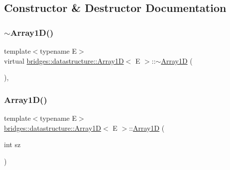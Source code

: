 \subsection{Constructor \& Destructor Documentation}
\mbox{\label{classbridges_1_1datastructure_1_1_array1_d_a690a7802e32842acfda2688459bb2caa}} 
\subsubsection{\texorpdfstring{$\sim$Array1D()}{~Array1D()}}
{\footnotesize\ttfamily template$<$typename E$>$ \\
virtual \mbox{\hyperlink{classbridges_1_1datastructure_1_1_array1_d}{bridges\+::datastructure\+::\+Array1D}}$<$ E $>$\+::$\sim$\mbox{\hyperlink{classbridges_1_1datastructure_1_1_array1_d}{Array1D}} (\begin{DoxyParamCaption}{ }\end{DoxyParamCaption})\hspace{0.3cm}{\ttfamily [inline]}, {\ttfamily [virtual]}}

\mbox{\label{classbridges_1_1datastructure_1_1_array1_d_a04e070ed24a1c6e9d200add01ec91c95}} 
\subsubsection{\texorpdfstring{Array1D()}{Array1D()}}
{\footnotesize\ttfamily template$<$typename E$>$ \\
\mbox{\hyperlink{classbridges_1_1datastructure_1_1_array1_d}{bridges\+::datastructure\+::\+Array1D}}$<$ E $>$\+::\mbox{\hyperlink{classbridges_1_1datastructure_1_1_array1_d}{Array1D}} (\begin{DoxyParamCaption}\item[{int}]{sz }\end{DoxyParamCaption})\hspace{0.3cm}{\ttfamily [inline]}}



